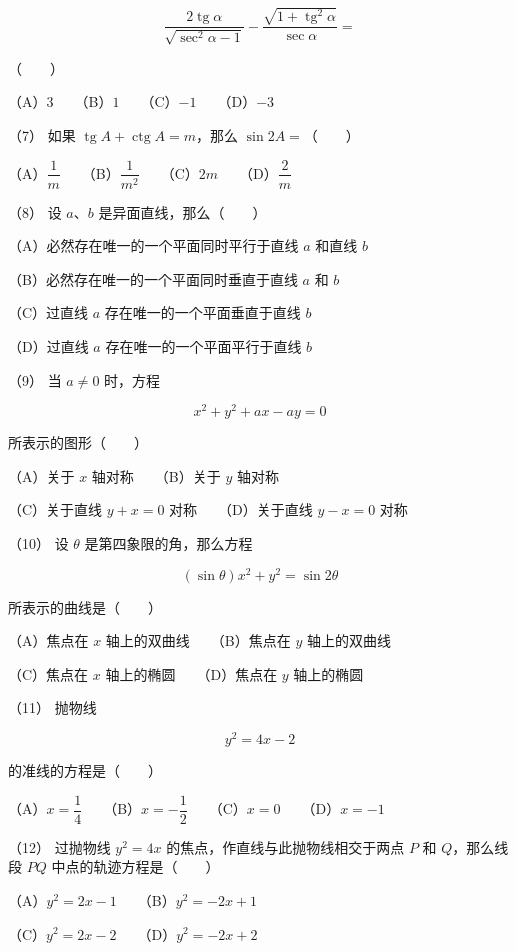 \begin{answer}
\nopagebreak[4]
\[
\frac{2\operatorname{tg}\alpha}{\sqrt{\operatorname{sec}^2\alpha-1}}
-\frac{\sqrt{1+\operatorname{tg}^2\alpha}}{\operatorname{sec}\alpha}=
\]

\mbox{（　　）}

（A）$3$　　（B）$1$　　（C）$-1$　　（D）$-3$

（7） 如果 $\operatorname{tg}A+\operatorname{ctg}A=m$，那么 $\sin2A=$\mbox{（　　）}

（A）$\dfrac1m$　　（B）$\dfrac1{m^2}$　　（C）$2m$　　（D）$\dfrac2m$

（8） 设 $a\text{、}b$ 是异面直线，那么\mbox{（　　）}

（A）必然存在唯一的一个平面同时平行于直线 $a$ 和直线 $b$

（B）必然存在唯一的一个平面同时垂直于直线 $a$ 和 $b$

（C）过直线 $a$ 存在唯一的一个平面垂直于直线 $b$

（D）过直线 $a$ 存在唯一的一个平面平行于直线 $b$

（9） 当 $a\ne0$ 时，方程

\nopagebreak[4]
\[
x^2+y^2+ax-ay=0
\]

所表示的图形\mbox{（　　）}

（A）关于 $x$ 轴对称　　（B）关于 $y$ 轴对称

（C）关于直线 $y+x=0$ 对称　　（D）关于直线 $y-x=0$ 对称

（10） 设 $\theta$ 是第四象限的角，那么方程

\nopagebreak[4]
\[
(\sin\theta)x^2+y^2=\sin2\theta
\]

所表示的曲线是\mbox{（　　）}

（A）焦点在 $x$ 轴上的双曲线　　（B）焦点在 $y$ 轴上的双曲线

（C）焦点在 $x$ 轴上的椭圆　　（D）焦点在 $y$ 轴上的椭圆

（11） 抛物线

\nopagebreak[4]
\[
y^2=4x-2
\]

的准线的方程是\mbox{（　　）}

（A）$x=\dfrac14$　　（B）$x=-\dfrac12$　　（C）$x=0$　　（D）$x=-1$

（12） 过抛物线 $y^2=4x$ 的焦点，作直线与此抛物线相交于两点 $P$ 和 $Q$，那么线段 $PQ$ 中点的轨迹方程是\mbox{（　　）}

（A）$y^2=2x-1$　　（B）$y^2=-2x+1$

（C）$y^2=2x-2$　　（D）$y^2=-2x+2$


\end{answer}

